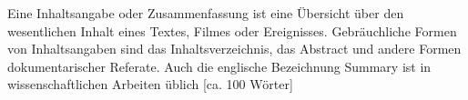 Eine Inhaltsangabe oder Zusammenfassung ist eine Übersicht über den wesentlichen Inhalt eines Textes, Filmes oder Ereignisses. Gebräuchliche Formen von Inhaltsangaben sind das Inhaltsverzeichnis, das Abstract und andere Formen dokumentarischer Referate. Auch die englische Bezeichnung Summary ist in wissenschaftlichen Arbeiten üblich [ca. 100 Wörter]

